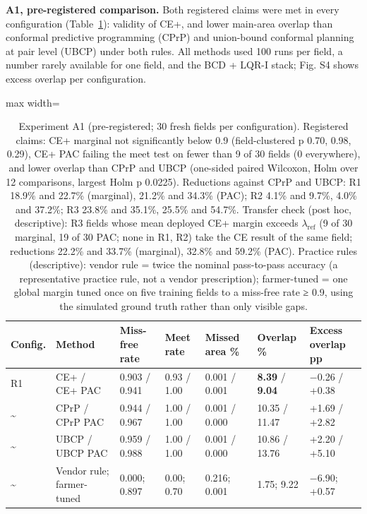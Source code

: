 \documentclass[preprint,12pt,authoryear]{elsarticle}
\begin{document}
\textbf{A1, pre-registered comparison.} Both registered claims were met in every configuration (Table~\ref{tab:6}): validity of CE+, and lower main-area overlap than conformal predictive programming (CPrP) and union-bound conformal planning at pair level (UBCP) under both rules. All methods used 100 runs per field, a number rarely available for one field, and the BCD + LQR-I stack; Fig. S4 shows excess overlap per configuration.

\begin{table}[!htbp]
\centering
\footnotesize
\caption{Experiment A1 (pre-registered; 30 fresh fields per configuration). Registered claims: CE+ marginal not significantly below 0.9 (field-clustered p 0.70, 0.98, 0.29), CE+ PAC failing the meet test on fewer than 9 of 30 fields (0 everywhere), and lower overlap than CPrP and UBCP (one-sided paired Wilcoxon, Holm over 12 comparisons, largest Holm p 0.0225). Reductions against CPrP and UBCP: R1 18.9\% and 22.7\% (marginal), 21.2\% and 34.3\% (PAC); R2 4.1\% and 9.7\%, 4.0\% and 37.2\%; R3 23.8\% and 35.1\%, 25.5\% and 54.7\%. Transfer check (post hoc, descriptive): R3 fields whose mean deployed CE+ margin exceeds \(\lambda_\mathrm{ref}\) (9 of 30 marginal, 19 of 30 PAC; none in R1, R2) take the CE result of the same field; reductions 22.2\% and 33.7\% (marginal), 32.8\% and 59.2\% (PAC). Practice rules (descriptive): vendor rule = twice the nominal pass-to-pass accuracy (a representative practice rule, not a vendor prescription); farmer-tuned = one global margin tuned once on five training fields to a miss-free rate ≥ 0.9, using the simulated ground truth rather than only visible gaps.}\label{tab:6}
\begin{adjustbox}{max width=\textwidth}
\begin{tabular}{@{}l>{\raggedright\arraybackslash}p{15.1em}llll>{\raggedright\arraybackslash}p{7.3em}@{}}
\toprule
\textbf{Config.} & \textbf{Method} & \textbf{Miss-free rate} & \textbf{Meet rate} & \textbf{Missed area \%} & \textbf{Overlap \%} & \textbf{Excess overlap pp} \\
\midrule
R1 & CE+ / CE+ PAC & 0.903 / 0.941 & 0.93 / 1.00 & 0.001 / 0.001 & \textbf{8.39} / \textbf{9.04} & −0.26 / +0.38 \\
\textasciitilde{} & CPrP / CPrP PAC & 0.944 / 0.967 & 1.00 / 1.00 & 0.001 / 0.000 & 10.35 / 11.47 & +1.69 / +2.82 \\
\textasciitilde{} & UBCP / UBCP PAC & 0.959 / 0.988 & 1.00 / 1.00 & 0.001 / 0.000 & 10.86 / 13.76 & +2.20 / +5.10 \\
\textasciitilde{} & Vendor rule; farmer-tuned & 0.000; 0.897 & 0.00; 0.70 & 0.216; 0.001 & 1.75; 9.22 & −6.90; +0.57 \\

\end{tabular}
\end{adjustbox}
\end{table}
\end{document}
